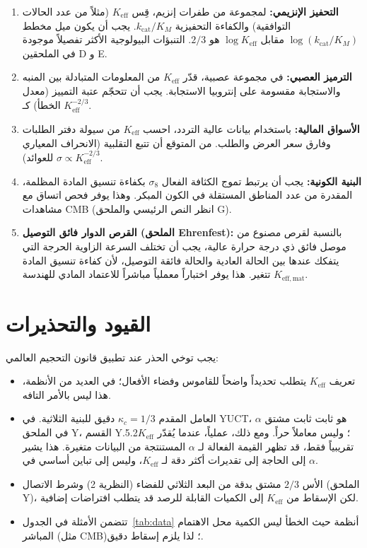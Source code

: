 \documentclass[11pt,a4paper]{article}
\newcommand{\ar}[1]{\foreignlanguage{arabic}{#1}}
\newcommand{\Keff}{K_{\mathrm{eff}}}
\newcommand{\kappac}{\kappa_c}
\begin{document}
	\begin{enumerate}
		\item \textbf{\ar{التحفيز الإنزيمي:}} \ar{لمجموعة من طفرات إنزيم، قِس \(\Keff\) (مثلاً من عدد الحالات التوافقية) والكفاءة التحفيزية \(k_{\text{cat}}/K_M\). يجب أن يكون ميل مخطط \(\log(k_{\text{cat}}/K_M)\) مقابل \(\log \Keff\) هو \(2/3\). التنبؤات البيولوجية الأكثر تفصيلاً موجودة في الملحقين D و E.}
		\item \textbf{\ar{الترميز العصبي:}} \ar{في مجموعة عصبية، قدّر \(\Keff\) من المعلومات المتبادلة بين المنبه والاستجابة مقسومة على إنتروبيا الاستجابة. يجب أن تتحجّم عتبة التمييز (معدل الخطأ) كـ \(\Keff^{-2/3}\).}
		\item \textbf{\ar{الأسواق المالية:}} \ar{باستخدام بيانات عالية التردد، احسب \(\Keff\) من سيولة دفتر الطلبات وفارق سعر العرض والطلب. من المتوقع أن تتبع التقلبية (الانحراف المعياري للعوائد) \(\sigma \propto \Keff^{-2/3}\).}
		\item \textbf{\ar{البنية الكونية:}} \ar{يجب أن يرتبط تموج الكثافة الفعال \(\sigma_8\) بكفاءة تنسيق المادة المظلمة، المقدرة من عدد المناطق المستقلة في الكون المبكر. وهذا يوفر فحص اتساق مع مشاهدات CMB (انظر النص الرئيسي والملحق G).}
		\item \textbf{\ar{القرص الدوار فائق التوصيل (الملحق Ehrenfest):}} \ar{بالنسبة لقرص مصنوع من موصل فائق ذي درجة حرارة عالية، يجب أن تختلف السرعة الزاوية الحرجة التي يتفكك عندها بين الحالة العادية والحالة فائقة التوصيل، لأن كفاءة تنسيق المادة \(K_{\mathrm{eff,mat}}\) تتغير. هذا يوفر اختباراً معملياً مباشراً للاعتماد المادي للهندسة.}
	\end{enumerate}
	
	\section{\ar{القيود والتحذيرات}}
	\label{sec:limitations}
	
	\ar{يجب توخي الحذر عند تطبيق قانون التحجيم العالمي:}
	\begin{itemize}
		\item \ar{تعريف \(\Keff\) يتطلب تحديداً واضحاً للقاموس وفضاء الأفعال؛ في العديد من الأنظمة، هذا ليس بالأمر التافه.}
		\item \ar{العامل المقدم \(\kappac = 1/3\) دقيق للبنية الثلاثية. في YUCT، \(\alpha\) هو ثابت ثابت مشتق في الملحق Y، القسم Y.5.2؛ وليس معاملاً حراً. ومع ذلك، عملياً، عندما يُقدّر \(\Keff\) تقريبياً فقط، قد تظهر القيمة الفعالة لـ \(\alpha\) المستنتجة من البيانات متغيرة. هذا يشير إلى الحاجة إلى تقديرات أكثر دقة لـ \(\Keff\)، وليس إلى تباين أساسي في \(\alpha\).}
		\item \ar{الأس \(2/3\) مشتق بدقة من البعد الثلاثي للفضاء (النظرية 2) وشرط الاتصال (الملحق Y)، لكن الإسقاط من \(\Keff\) إلى الكميات القابلة للرصد قد يتطلب افتراضات إضافية.}
		\item \ar{تتضمن الأمثلة في الجدول~\ref{tab:data} أنظمة حيث الخطأ ليس الكمية محل الاهتمام المباشر (مثل CMB)؛ لذا يلزم إسقاط دقيق.}
	\end{itemize}
	
\end{document}
